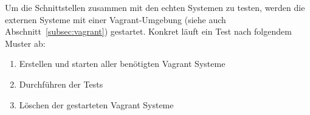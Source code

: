 \begin{description}
					Um die Schnittstellen zusammen mit den echten Systemen zu testen,
					werden die externen Systeme mit einer Vagrant-Umgebung (siehe auch Abschnitt~\ref{subsec:vagrant}) gestartet.
					Konkret läuft ein Test nach folgendem Muster ab:
					\begin{enumerate}
						\item Erstellen und starten aller benötigten Vagrant Systeme
						\item Durchführen der Tests
						\item Löschen der gestarteten Vagrant Systeme
					\end{enumerate}


			\end{description}